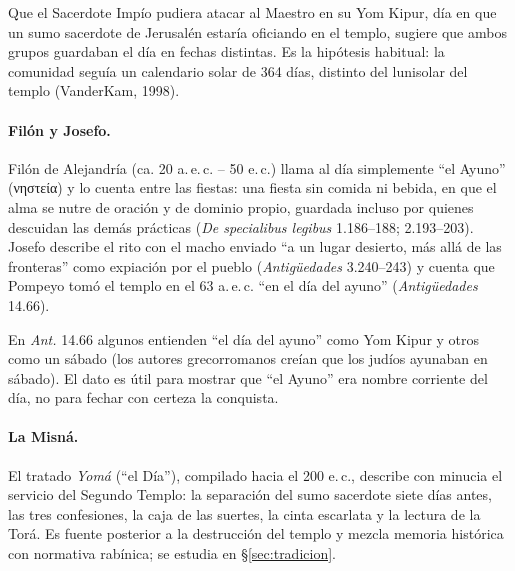 \documentclass[11pt,letterpaper]{article}
\newcommand{\grc}[1]{\foreignlanguage{ancientgreek}{#1}}
\begin{document}
\begin{nota}
Que el Sacerdote Impío pudiera atacar al Maestro en su Yom Kipur, día en que un sumo sacerdote de Jerusalén estaría oficiando en el templo, sugiere que ambos grupos guardaban el día en fechas distintas. Es la hipótesis habitual: la comunidad seguía un calendario solar de 364 días, distinto del lunisolar del templo (VanderKam, 1998).
\end{nota}

\paragraph{Filón y Josefo.} Filón de Alejandría (ca. 20 a.\,e.\,c. -- 50 e.\,c.) llama al día simplemente ``el Ayuno'' (\grc{νηστεία}) y lo cuenta entre las fiestas: una fiesta sin comida ni bebida, en que el alma se nutre de oración y de dominio propio, guardada incluso por quienes descuidan las demás prácticas (\emph{De specialibus legibus} 1.186--188; 2.193--203). Josefo describe el rito con el macho enviado ``a un lugar desierto, más allá de las fronteras'' como expiación por el pueblo (\emph{Antigüedades} 3.240--243) y cuenta que Pompeyo tomó el templo en el 63 a.\,e.\,c. ``en el día del ayuno'' (\emph{Antigüedades} 14.66).

\begin{nota}[Precisión]
En \emph{Ant.} 14.66 algunos entienden ``el día del ayuno'' como Yom Kipur y otros como un sábado (los autores grecorromanos creían que los judíos ayunaban en sábado). El dato es útil para mostrar que ``el Ayuno'' era nombre corriente del día, no para fechar con certeza la conquista.
\end{nota}

\paragraph{La Misná.} El tratado \emph{Yomá} (``el Día''), compilado hacia el 200 e.\,c., describe con minucia el servicio del Segundo Templo: la separación del sumo sacerdote siete días antes, las tres confesiones, la caja de las suertes, la cinta escarlata y la lectura de la Torá. Es fuente posterior a la destrucción del templo y mezcla memoria histórica con normativa rabínica; se estudia en §\ref{sec:tradicion}.
\end{document}
